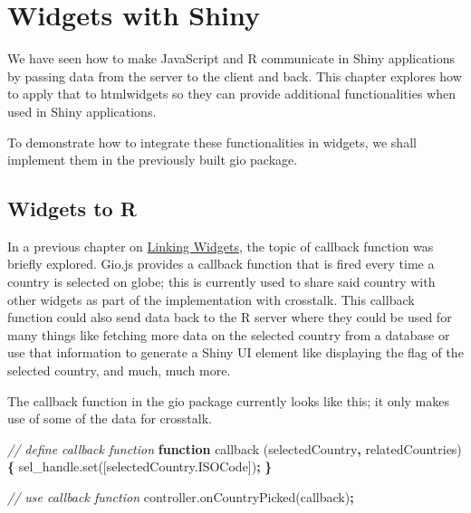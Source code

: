 \documentclass[10pt,]{krantz}
\makeatletter
\newenvironment{Shaded}{\begin{snugshade}}{\end{snugshade}}
\newcommand{\AttributeTok}[1]{\textcolor[rgb]{0.61,0.61,0.61}{#1}}
\newcommand{\CommentTok}[1]{\textcolor[rgb]{0.37,0.37,0.37}{\textit{#1}}}
\newcommand{\KeywordTok}[1]{\textcolor[rgb]{0.27,0.27,0.27}{\textbf{#1}}}
\newcommand{\NormalTok}[1]{#1}
\newcommand{\OperatorTok}[1]{\textcolor[rgb]{0.43,0.43,0.43}{\textbf{#1}}}
\newcommand{\VariableTok}[1]{\textcolor[rgb]{0,0,0}{#1}}
\newenvironment{kframe}{%
\medskip{}
\setlength{\fboxsep}{.8em}
 \def\at@end@of@kframe{}%
 \ifinner\ifhmode%
  \def\at@end@of@kframe{\end{minipage}}%
  \begin{minipage}{\columnwidth}%
 \fi\fi%
 \def\FrameCommand##1{\hskip\@totalleftmargin \hskip-\fboxsep
 \colorbox{shadecolor}{##1}\hskip-\fboxsep
     \hskip-\linewidth \hskip-\@totalleftmargin \hskip\columnwidth}%
 \MakeFramed {\advance\hsize-\width
   \@totalleftmargin\z@ \linewidth\hsize
   \@setminipage}}%
 {\par\unskip\endMakeFramed%
 \at@end@of@kframe}
\renewenvironment{Shaded}{\begin{kframe}}{\end{kframe}}
\makeatother
\begin{document}
\hypertarget{shiny-widgets}{%
\chapter{Widgets with Shiny}\label{shiny-widgets}}

We have seen how to make JavaScript and R communicate in Shiny applications by passing data from the server to the client and back. This chapter explores how to apply that to htmlwidgets so they can provide additional functionalities when used in Shiny applications.

To demonstrate how to integrate these functionalities in widgets, we shall implement them in the previously built gio package.

\hypertarget{shiny-widgets-to-r}{%
\section{Widgets to R}\label{shiny-widgets-to-r}}

In a previous chapter on \protect\hyperlink{linking-widgets}{Linking Widgets}, the topic of callback function was briefly explored. Gio.js provides a callback function that is fired every time a country is selected on globe; this is currently used to share said country with other widgets as part of the implementation with crosstalk. This callback function could also send data back to the R server where they could be used for many things like fetching more data on the selected country from a database or use that information to generate a Shiny UI element like displaying the flag of the selected country, and much, much more.

The callback function in the gio package currently looks like this; it only makes use of some of the data for crosstalk.

\begin{Shaded}
\begin{Highlighting}[]
\CommentTok{// define callback function}
\KeywordTok{function} \AttributeTok{callback}\NormalTok{ (selectedCountry}\OperatorTok{,}\NormalTok{ relatedCountries) }\OperatorTok{\{}
  \VariableTok{sel_handle}\NormalTok{.}\AttributeTok{set}\NormalTok{([}\VariableTok{selectedCountry}\NormalTok{.}\AttributeTok{ISOCode}\NormalTok{])}\OperatorTok{;}
\OperatorTok{\}}

\CommentTok{// use callback function}
\VariableTok{controller}\NormalTok{.}\AttributeTok{onCountryPicked}\NormalTok{(callback)}\OperatorTok{;}
\end{Highlighting}
\end{Shaded}
\end{document}
